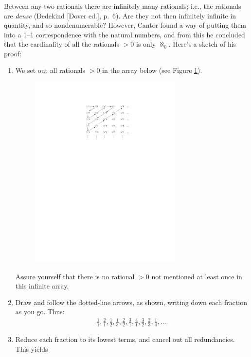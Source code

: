\documentclass[twoside,openright]{article}
\begin{document}
\begin{enumerate}
  Between any two rationals there are infinitely many rationals; i.e.,
  the rationals are \emph{dense} (Dedekind [Dover ed.], p.~6). Are
  they not then infinitely infinite in quantity, and so
  nondenumerable? However, Cantor found a way of putting them into a
  1--1 correspondence with the natural numbers, and from this he
  concluded that the cardinality of all the rationals $>0$ is only
  $\aleph_{0}$. Here's a sketch of his proof: \label{rationalarray}
  \begin{enumerate}[(1)]
  \item We set out all rationals $>0$ in the array below (see Figure
    \ref{array}).
    \begin{figure}[htbp] %
      \centering
      \includegraphics[width=3in]{fig/rationalsarray}
      \caption{}
      \label{array}
    \end{figure} Assure yourself that there is no rational $>0$ not
    mentioned at least once in this infinite array.
  \item Draw and follow the dotted-line arrows, as shown, writing down
    each fraction as you go. Thus\label{orderedrationalarray}:
    \begin{align*}
      \tfrac{1}{1},  \tfrac{2}{1},  \tfrac{1}{2}, \tfrac{1}{3},
      \tfrac{2}{2}, \tfrac{3}{1}, \tfrac{4}{1}, \tfrac{3}{2},
      \tfrac{2}{3}, \tfrac{1}{4}, \ldots.
    \end{align*}
  \item Reduce each fraction to its lowest terms, and cancel out all
    redundancies. This yields
    \begin{align*}

\end{align*}
\end{enumerate}
\end{enumerate}
\end{document}
